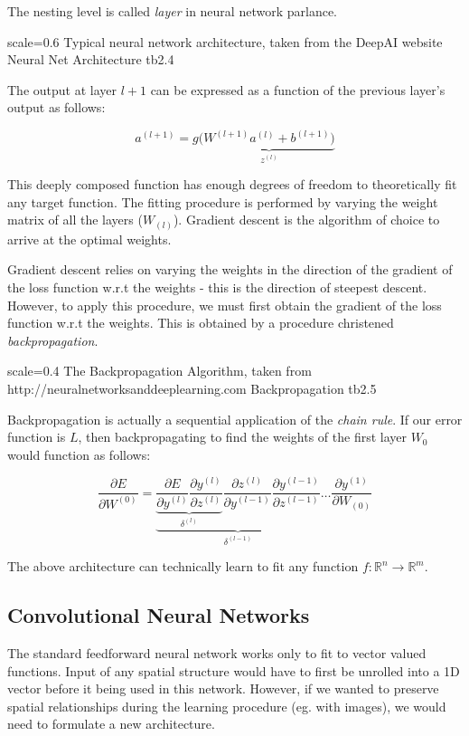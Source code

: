 The nesting level is called \emph{layer} in neural network parlance. 

{scale=0.6}%
{Typical neural network architecture, taken from the DeepAI website}%
{Neural Net Architecture}%
{tb2.4} %

The output at layer $l+1$ can be expressed as a function of the previous layer's output as follows:

\[a^{(l+1)} = g(\underbrace{W^{(l+1)}a^{(l)} + b^{(l+1)})}_{z^{(l)}}\]

This deeply composed function has enough degrees of freedom to theoretically fit any target function. The fitting procedure is performed by varying the weight matrix of all the layers ($W_{(l)}$). Gradient descent is the algorithm of choice to arrive at the optimal weights.

Gradient descent relies on varying the weights in the direction of the gradient of the loss function w.r.t the weights - this is the direction of steepest descent. However, to apply this procedure, we must first obtain the gradient of the loss function w.r.t the weights. This is obtained by a procedure christened \emph{backpropagation}.

{scale=0.4}%
{The Backpropagation Algorithm, taken from http://neuralnetworksanddeeplearning.com }%
{Backpropagation}%
{tb2.5} %

Backpropagation is actually a sequential application of the \emph{chain rule}. 
If our error function is $L$, then backpropagating to find the weights of the first layer $W_0$ would function as follows:

\[\frac{\partial E}{\partial W^{(0)}} =  \underbrace{\underbrace{\frac{\partial E}{\partial y^{(l)}} \frac{\partial y^{(l)}}{\partial z^{(l)}}}_{\delta^{(l)}} \frac{\partial z^{(l)}}{\partial y^{(l-1)}} \frac{\partial y^{(l-1)}}{\partial z^{(l-1)}}}_{\delta^{(l-1)}} \dots \frac{\partial y^{(1)}}{\partial W_{(0)}}\]

The above architecture can technically learn to fit any function 
$f: \mathbb{R}^n \rightarrow \mathbb{R}^m $.

\subsection{Convolutional Neural Networks}
The standard feedforward neural network works only to fit to vector valued functions. Input of any spatial structure would have to first be unrolled into a 1D vector before it being used in this network. However, if we wanted to preserve spatial relationships during the learning procedure (eg. with images), we would need to formulate a new architecture.

